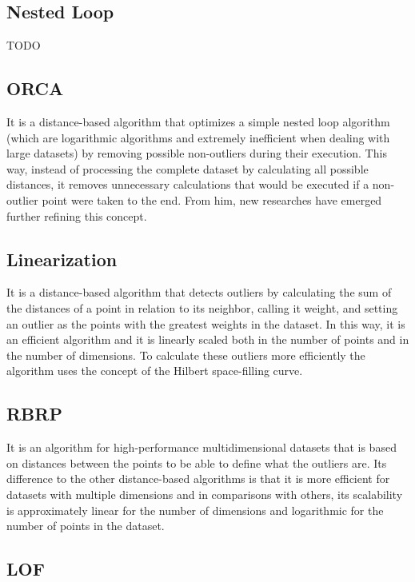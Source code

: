 \subsection{Nested Loop}

TODO

\subsection{ORCA}

It is a distance-based algorithm that optimizes a simple nested loop algorithm (which are
logarithmic algorithms and extremely inefficient when dealing with large datasets) by
removing possible non-outliers during their execution. This way, instead of processing
the complete dataset by calculating all possible distances, it removes unnecessary
calculations that would be executed if a non-outlier point were taken to the end. From him,
new researches have emerged further refining this concept.

\subsection{Linearization}

It is a distance-based algorithm that detects outliers by calculating the sum of the distances
of a point in relation to its neighbor, calling it weight, and setting an outlier as the points
with the greatest weights in the dataset. In this way, it is an efficient algorithm and it is
linearly scaled both in the number of points and in the number of dimensions. To calculate these
outliers more efficiently the algorithm uses the concept of the Hilbert space-filling curve.

\subsection{RBRP}

It is an algorithm for high-performance multidimensional datasets that is based on
distances between the points to be able to define what the outliers are. Its difference
to the other distance-based algorithms is that it is more efficient for datasets with
multiple dimensions and in comparisons with others, its scalability is approximately
linear for the number of dimensions and logarithmic for the number of points in the
dataset.

\subsection{LOF}

